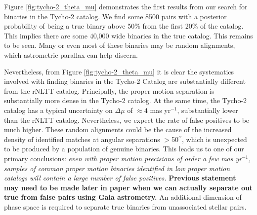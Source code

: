 \documentclass[usenatbib]{mnras}
\newcommand{\asec}{\ifmmode {^{\prime\prime}}\else$^{\prime\prime}$\fi}
\begin{document}
 
 



Figure \ref{fig:tycho-2_theta_mu} demonstrates the first results from our search for binaries in the Tycho-2 catalog. We find some 8500 pairs with a posterior probability of being a true binary above 50\% from the first 20\% of the catalog. This implies there are some 40,000 wide binaries in the true catalog. This remains to be seen. Many or even most of these binaries may be random alignments, which astrometric parallax can help discern. 

Nevertheless, from Figure \ref{fig:tycho-2_theta_mu} it is clear the systematics involved with finding binaries in the Tycho-2 Catalog are substantially different from the rNLTT catalog. Principally, the proper motion separation is substantially more dense in the Tycho-2 catalog. At the same time, the Tycho-2 catalog has a typical uncertainty on $\Delta \mu$ of $\approx4$ mas yr$^{-1}$, substantially lower than the rNLTT catalog. Nevertheless, we expect the rate of false positives to be much higher. These random alignments could be the cause of the increased density of identified matches at angular separations $>$50\asec, which is unexpected to be produced by a population of genuine binaries. This leads us to one of our primary conclusions: {\it even with proper motion precisions of order a few mas yr$^{-1}$, samples of common proper motion binaries identified in low proper motion catalogs will contain a large number of false positives. } {\bf Previous statement may need to be made later in paper when we can actually separate out true from false pairs using Gaia astrometry.} An additional dimension of phase space is required to separate true binaries from unassociated stellar pairs.
\end{document}
